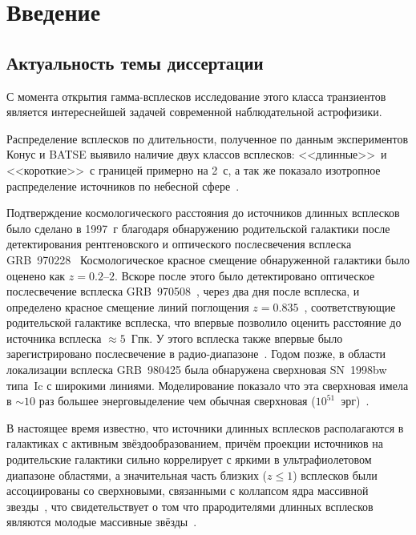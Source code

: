\chapter{Введение}					
	
\section{Актуальность темы диссертации}
С момента открытия гамма-всплесков исследование этого класса транзиентов
является интереснейшей задачей современной наблюдательной астрофизики.

Распределение всплесков по длительности, полученное по данным экспериментов 
Конус и BATSE выявило наличие двух классов всплесков: <<длинные>>\ и <<короткие>>\ 
с границей примерно на 2~с, а так же показало изотропное распределение источников 
по небесной сфере~\citep{Mazets_1981_part_1,Briggs_1993ApJ}.  

Подтверждение космологического расстояния до источников длинных всплесков 
было сделано в 1997~г благодаря обнаружению родительской галактики после детектирования 
рентгеновского и оптического послесвечения всплеска GRB~970228~\citep{Costa1997Natur, van_Paradijs_1997Natur} 
Космологическое красное смещение обнаруженной галактики было оценено как $z=0.2\textrm{--}2$.
Вскоре после этого было детектировано оптическое послесвечение всплеска 
GRB~970508~\citep{Djorgovski1997Natur}, через два дня после всплеска, и определено красное смещение линий 
поглощения $z=0.835$~\citep{Metzger_1997Natur, Reichart_1998ApJ}, соответствующие родительской галактике 
всплеска, что впервые позволило оценить расстояние до источника всплеска $\approx 5$~Гпк. 
У этого всплеска также впервые было зарегистрировано послесвечение в радио-диапазоне~\citep{Frail_1997Natur}.
Годом позже, в области локализации всплеска GRB~980425 была обнаружена сверхновая 
SN~1998bw типа~Ic с широкими линиями. Моделирование показало что эта сверхновая 
имела в $\sim 10$ раз большее энерговыделение чем обычная 
сверхновая ($10^{51}$~эрг)~\citep{Hjorth_and_Bloom_2012in_book}.

В настоящее время известно, что источники длинных всплесков располагаются в галактиках 
с активным звёздообразованием, причём проекции источников на родительские галактики сильно
коррелирует с яркими в ультрафиолетовом диапазоне областями, а значительная часть 
близких ($z \le 1$) всплесков были ассоциированы со сверхновыми, связанными с 
коллапсом ядра массивной звезды~\citep{Hjorth_and_Bloom_2012in_book},
что свидетельствует о том что прародителями длинных всплесков являются молодые 
массивные звёзды~\citep[см. обзор][]{Berger_2014}.

